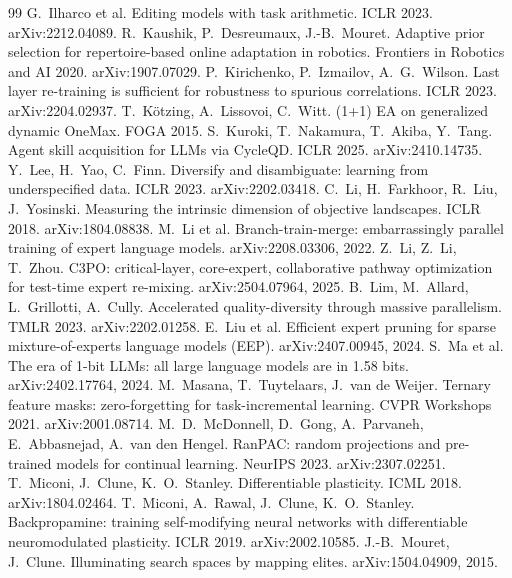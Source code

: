\documentclass[11pt,a4paper]{article}
\theoremstyle{definition}
\theoremstyle{plain}
\theoremstyle{remark}
\begin{document}
\begin{thebibliography}{99}
 G.~Ilharco et al. Editing models with task arithmetic. ICLR 2023. arXiv:2212.04089.
 R.~Kaushik, P.~Desreumaux, J.-B.~Mouret. Adaptive prior selection for repertoire-based online adaptation in robotics. Frontiers in Robotics and AI 2020. arXiv:1907.07029.
 P.~Kirichenko, P.~Izmailov, A.~G.~Wilson. Last layer re-training is sufficient for robustness to spurious correlations. ICLR 2023. arXiv:2204.02937.
 T.~Kötzing, A.~Lissovoi, C.~Witt. (1+1) EA on generalized dynamic OneMax. FOGA 2015.
 S.~Kuroki, T.~Nakamura, T.~Akiba, Y.~Tang. Agent skill acquisition for LLMs via CycleQD. ICLR 2025. arXiv:2410.14735.
 Y.~Lee, H.~Yao, C.~Finn. Diversify and disambiguate: learning from underspecified data. ICLR 2023. arXiv:2202.03418.
 C.~Li, H.~Farkhoor, R.~Liu, J.~Yosinski. Measuring the intrinsic dimension of objective landscapes. ICLR 2018. arXiv:1804.08838.
 M.~Li et al. Branch-train-merge: embarrassingly parallel training of expert language models. arXiv:2208.03306, 2022.
 Z.~Li, Z.~Li, T.~Zhou. C3PO: critical-layer, core-expert, collaborative pathway optimization for test-time expert re-mixing. arXiv:2504.07964, 2025.
 B.~Lim, M.~Allard, L.~Grillotti, A.~Cully. Accelerated quality-diversity through massive parallelism. TMLR 2023. arXiv:2202.01258.
 E.~Liu et al. Efficient expert pruning for sparse mixture-of-experts language models (EEP). arXiv:2407.00945, 2024.
 S.~Ma et al. The era of 1-bit LLMs: all large language models are in 1.58 bits. arXiv:2402.17764, 2024.
 M.~Masana, T.~Tuytelaars, J.~van de Weijer. Ternary feature masks: zero-forgetting for task-incremental learning. CVPR Workshops 2021. arXiv:2001.08714.
 M.~D.~McDonnell, D.~Gong, A.~Parvaneh, E.~Abbasnejad, A.~van den Hengel. RanPAC: random projections and pre-trained models for continual learning. NeurIPS 2023. arXiv:2307.02251.
 T.~Miconi, J.~Clune, K.~O.~Stanley. Differentiable plasticity. ICML 2018. arXiv:1804.02464.
 T.~Miconi, A.~Rawal, J.~Clune, K.~O.~Stanley. Backpropamine: training self-modifying neural networks with differentiable neuromodulated plasticity. ICLR 2019. arXiv:2002.10585.
 J.-B.~Mouret, J.~Clune. Illuminating search spaces by mapping elites. arXiv:1504.04909, 2015.

\end{thebibliography}
\end{document}
